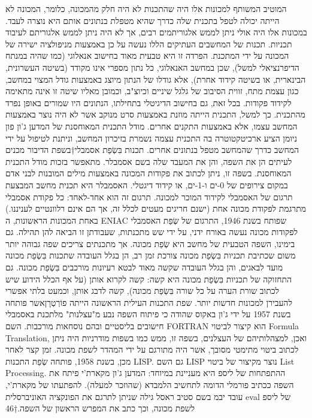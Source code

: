 \begin{טבלא}[!htbp]
        המוטיב המשותף למכונות אלו היה שהתכנות לא היה חלק מהמכונה, כלומר, המכונה לא
        הייתה יכולה לטפל בתכנית שלה כדרך שהיא מטפלת בנתונים אותם היא נוצרה לעבד.
        במכונות אלו היה אולי ניתן לממש אלגוריתמים רבים, אך לא היה ניתן לממש אלגוריתם
        לעיבוד תכניות. תכנות של המחשבים העתיקים הללו נעשה על כן באמצעות מניפולציה ישירה
        של המכונה על ידי המתכנת. הפרדה זו היא טבעית מאוד בחישוב אנאלוגי (כמו שהיה
        במנתח הדיפרנציאלי למשל), שכן במחשב האנאלוגי, כל נתון מספרי אינו מקודד (בשיטה
        העשרונית, הבינארית, או בשיטה קידוד אחרת), אלא גודלו של הנתון מיוצג באמצעות גודל
        המצוי במחשב, כגון עצמת מתח, זווית הסיבוב של גלגל שיניים וכיוצ"ב, וכמובן מאליו
        שיטה זו אינה מתאימה לקידוד פקודות. בכל זאת, גם בחישוב הדיגיטלי בתחילתו,
        הנתונים היו שמורים באופן נפרד מהתכנית. כך למשל, התכנית הייתה מוזנת באמצעות סרט
        מנוקב אשר לא היה נוצר באמצעות המחשב עצמו, אלא באמצעות התקנים אחרים. מודל התכנית
        המאוחסנת של המדען ג'ון פון ניומן הציע ארכיטקטוטרה בה התכנית עצמה נשמרת בזיכרון
        המחשב, וניתנת לטיפול על ידי המחשב כדרך שהמחשב מטפל בנתונים אחרים. תכנות בִּשְׂפַת
        אסמבלי†{בשפת הדיבור מכנים לעיתים הן את השפה, והן את המעבד שלה בשם אסמבלר.} מתאפשר בזכות מודל התכנית המאוחסנת. בשפה זו, ניתן לכתוב את פקודות
        המכונה באמצעות מילים המובנות לבני אדם במקום צירופים של 0-ים ו-1-ים, או קידוד
        דיגטלי. האסמבלר היא תכנית מחשב המבצעת תרגום של האסמבלי לקידוד המוכר למכונה.
        תרגום זה הוא אחד-לאחד: כל פקודת אסמבלי מתרגמת לפקודת מכונה אחת (ישנם חריגים
        מעטים לכלל זה, אך הם אינם רלוונטיים לעניננו.) באחת המכונות הראשונות, ה ENIAC
        שפותח בשנת 1946, התרגום של שְׂפַת האסמבלי לפקודות מכונה נעשה באורח ידני, על ידי שש
        מתכנתות, שעבודתן זו הביאה להן תהילה. גם בימינו, השפה הטבעית של מחשב היא שְׂפַת
        מכונה. אך מתכנתים צריכים שפה גבוהה יותר משום שכתיבת תכניות בִּשְׂפַת מכונה צורכת
        זמן רב, הן בגלל העובדה שתכנות בִּשְׂפַת מכונה מועד לבאגים, והן בגלל העובדה שקשה
        מאוד לבטא רעיונות מורכבים בִּשְׂפַת מכונה. גם התחזוקה של תכניות בִּשְׂפַת מכונה היא
        קשה: קשה לקרוא אותן (על אף הכלל הידוע שיש לכתוב שורת הערה על כל שורה בִּשְׂפַת
        מכונה), קשה לדבג אותן, וכמעט בלתי אפשרי להעבירן למכונות חדשות יותר. שפת התכנות
        העילית הראשונה הייתה פוֹרְטְרָןאשר פותחה בשנת 1957 על ידי ג'ון באקוס שהודה כי פיתוח
        השפה נבע מ"עצלנות" מלתכנת באסמבלי חישובים בליסטיים ובהם נוסחאות מורכבות. השם
        FORTRAN הוא קיצור לביטוי Formula Translation, ואכן, למצהלותיהם של העצלנים, בשפה
        זו, ממש כמו בשפות מודרניות היה ניתן לכתוב ביטוי מתימטי מסובך, אשר היה מתורגם על
        ידי המהדר לשפת מכונה. זמן קצר לאחר מכן, בשנת 1958, פותחה שְׂפַת התכנות LISP. גם
        השם LISP נוצר מקיצור של ביטוי List Processing. ההתפתחות של ליספ היא מעניינת
        במיוחד: המדען ג'ון מקארת'י פיתח את השפה ככתיב פורמלי הדומה לתחשיב הלמבדא
        (שהוזכר למעלה). להפתעתו של מקארת'י, עובד יבמ בשם סטיב ראסל גילה שניתן לתרגם את
        הפונקציה האוניברסלית eval של ליספ לשפת מכונה, וכך כתב את המפרש הראשון של
        השפה.†{46}


\end{טבלא}
